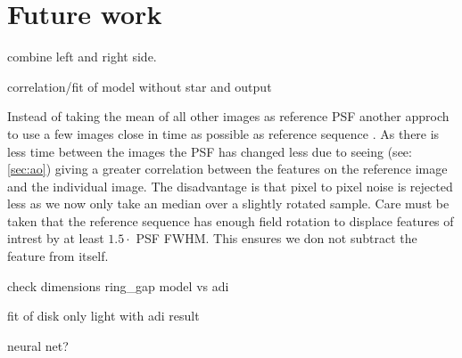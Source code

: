 \section{Future work}
\label{chap:future}
combine left and right side.

correlation/fit of model without star and output

Instead of taking the mean of all other images as reference \ac{PSF} another approch to use a few images close in time as possible as reference sequence \cite{Marois_2006}. As there is less time between the images the \ac{PSF} has changed less due to seeing  (see: \autoref{sec:ao}) giving a greater correlation between the features on the reference image and the individual image. The disadvantage is that pixel to pixel noise is rejected less as we now only take an median over a slightly rotated sample. Care must be taken that the reference sequence has enough field rotation to displace features of intrest by at least $1.5 \cdot$ \ac{PSF} \ac{FWHM}. This ensures we don not subtract the feature from itself. 

check dimensions ring_gap model vs adi

fit of disk only light with adi result

neural net?
